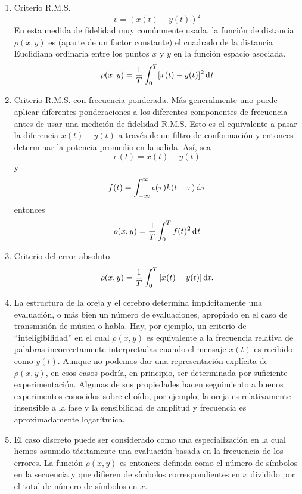 \begin{enumerate}
\item{Criterio R.M.S. 
\begin{equation} v = (x(t) - y(t))^{2} \end{equation}
En esta medida de fidelidad muy com\'unmente usada, la funci\'on de
distancia $\rho(x,y)$ es (aparte de un factor constante) el cuadrado
de la distancia Euclidiana ordinaria entre los puntos $x$ y $y$ en la
funci\'on espacio asociada.
\begin{equation} \rho(x, y) = \frac{1}{T} \int_0^T [x(t) - y(t)]^{2} \diff t \end{equation}}
\item{Criterio R.M.S. con frecuencia ponderada. M\'as generalmente uno puede
aplicar diferentes ponderaciones a los diferentes componentes de frecuencia
antes de usar una medici\'on de fidelidad R.M.S. Esto es el equivalente a pasar
la diferencia $x(t) - y(t)$ a trav\'es de un filtro de conformaci\'on y entonces 
determinar la potencia promedio en la salida.
As\'i, sea 
\begin{equation} e(t) = x(t) - y(t) \end{equation}
y
\begin{equation} f(t) = \int_{-\infty}^{\infty}  \epsilon(\tau)k(t - \tau) 
\diff \tau \end{equation}
entonces
\begin{equation} 
\rho (x, y) = \frac{1}{T} \int_0^T f(t)^{2} \diff t 
\end{equation}}
\item{Criterio del error absoluto
\begin{equation} 
\rho(x,y) = \frac{1}{T} \int_0^T | x(t) - y(t)| \diff t . 
\end{equation}}
\item{La estructura de la oreja y el cerebro determina
 impl\'icitamente una evaluaci\'on, o m\'as bien un n\'umero de
 evaluaciones, apropiado en el caso de transmisi\'on de m\'usica o
 habla. Hay, por ejemplo, un criterio de ``inteligibilidad'' en el cual
 $\rho(x,y)$ es equivalente a la frecuencia relativa de palabras
 incorrectamente interpretadas cuando el mensaje $x(t)$ es recibido
 como $y(t)$. Aunque no podemos dar una representaci\'on expl\'icita
 de $\rho(x,y)$, en esos casos podr\'ia, en principio, ser
 determinada por suficiente experimentaci\'on. Algunas de sus
 propiedades hacen seguimiento a buenos experimentos conocidos sobre
 el o\'ido, por ejemplo, la oreja es relativamente insensible a la
 fase y la sensibilidad de amplitud y frecuencia es aproximadamente
 logar\'itmica.}
\item{El caso discreto puede ser considerado como una
 especializaci\'on en la cual hemos asumido t\'acitamente una
 evaluaci\'on basada en la frecuencia de los errores. La funci\'on
 $\rho(x,y)$ es entonces definida como el n\'umero de s\'imbolos en
 la secuencia y que difieren de s\'imbolos correspondientes en $x$
 dividido por el total de n\'umero de s\'imbolos en $x$.}
\end{enumerate}

